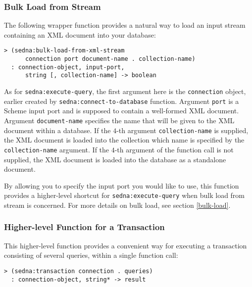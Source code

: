 \documentclass[a4paper,12pt]{article}
\begin{document}
\subsubsection{Bulk Load from Stream}

The following wrapper function provides a natural way to load an input stream
containing an XML document into your database:

\begin{verbatim}
> (sedna:bulk-load-from-xml-stream
      connection port document-name . collection-name)
  : connection-object, input-port,
      string [, collection-name] -> boolean
\end{verbatim}

As for \texttt{sedna:execute-query}, the first argument here is the
\texttt{connection} object, earlier created by
\texttt{sedna:connect-to-database} function. Argument \texttt{port} is a Scheme
input port and is supposed to contain a well-formed XML document. Argument
\texttt{document-name} specifies the name that will be given to the XML document
within a database. If the $4$-th argument \texttt{collection-name} is supplied,
the XML document is loaded into the collection which name is specified by the
\texttt{collection-name} argument. If the $4$-th argument of the function call
is not supplied, the XML document is loaded into the database as a standalone
document.

By allowing you to specify the input port you would like to use, this function
provides a higher-level shortcut for \texttt{sedna:execute-query} when bulk load
from stream is concerned. For more details on bulk load, see section
\ref{bulk-load}.


\subsubsection{Higher-level Function for a Transaction}

This higher-level function provides a convenient way for executing a transaction
consisting of several queries, within a single function call:

\begin{verbatim}
> (sedna:transaction connection . queries)
  : connection-object, string* -> result
\end{verbatim}
\end{document}
